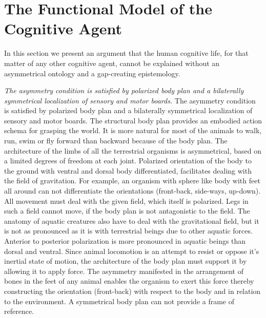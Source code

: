 \section{The Functional Model of the Cognitive Agent}


In this section we present an argument that the human cognitive life, for that matter of any other cognitive agent, cannot be explained without an asymmetrical ontology and a gap-creating epistemology.  

\emph{The asymmetry condition is satisfied by polarized body plan and a bilaterally symmetrical localization of sensory and motor boards.} The asymmetry condition is satisfied by polarized body plan and a bilaterally symmetrical localization of sensory and motor boards. 
The structural body plan provides an embodied action schema for grasping the world. It is more natural for most of the animals to walk, run, swim or fly forward than backward because of the body plan. The architecture of the limbs of all the terrestrial organisms is asymmetrical, based on a limited degrees of freedom at each joint. Polarized orientation of the body to the ground with ventral and dorsal body differentiated, facilitates dealing with the field of gravitation. For example, an organism with sphere like body with feet all around can not differentiate the orientations (front-back, side-ways, up-down). All movement must deal with the given field, which itself is polarized. Legs in such a field cannot move, if the body plan is not antagonistic to the field. The anatomy of aquatic creatures also have to deal with the gravitational field, but it is not as pronounced as it is with terrestrial beings due to other aquatic forces. Anterior to posterior polarization is more pronounced in aquatic beings than dorsal and ventral. Since animal locomotion is an attempt to resist or oppose it's inertial state of motion, the architecture of the body plan must support it by allowing it to apply force. The asymmetry manifested in the arrangement of bones in the feet of any animal enables the organism to exert this force thereby constructing the orientation (front-back) with respect to the body and in relation to the environment. A symmetrical body plan can not provide a frame of reference.

